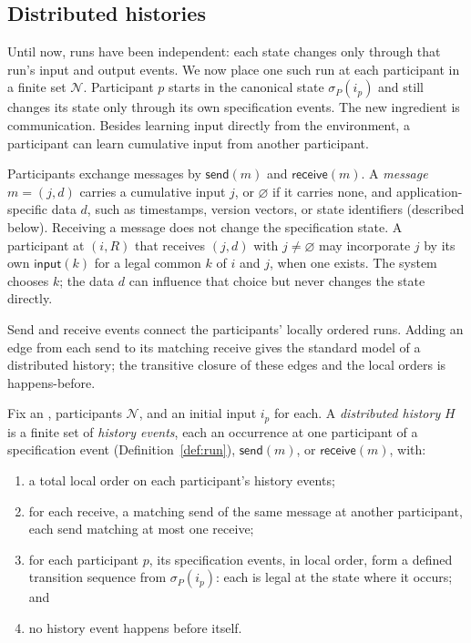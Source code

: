 
\subsection{Distributed histories}
\label{sec:histories}

Until now, runs have been independent: each state changes only through that
run's input and output events.  We now place one such run at each participant in
a finite set $\mathcal N$.  Participant $p$ starts in the canonical state
$\sigma_P(i_p)$ and still changes its state only through its own specification
events.  The new ingredient is communication.  Besides learning input directly
from the environment, a participant can learn cumulative input from another
participant.

Participants exchange messages by $\mathsf{send}(m)$ and
$\mathsf{receive}(m)$.  A \emph{message} $m=(j,d)$ carries a cumulative input $j$, or $\varnothing$ if it
carries none, and application-specific data $d$, such as timestamps, version
vectors, or state identifiers (described below).  Receiving a message does not
change the specification state.  A participant at $(i,R)$ that receives $(j,d)$ with
$j\neq\varnothing$ may incorporate $j$ by its own $\mathsf{input}(k)$ for a
legal common \indesc $k$ of $i$ and $j$, when one exists.  The system chooses $k$; the data $d$ can influence that choice but never
changes the state directly.

Send and receive events connect the participants' locally ordered runs.  Adding
an edge from each send to its matching receive gives the standard model of a
distributed history; the transitive closure of these edges and the local orders
is happens-before.

\begin{definition}
\label{def:distributed-history}
Fix an \spectype, participants $\mathcal N$, and an initial input $i_p$
for each.  A \emph{distributed history} $H$ is a finite set of
\emph{history events}, each an occurrence at one participant of a
specification event (Definition~\ref{def:run}), $\mathsf{send}(m)$, or
$\mathsf{receive}(m)$, with:
\begin{enumerate}
  \item a total local order on each participant's history events;
  \item for each receive, a matching send of the same message at another
        participant, each send matching at most one receive;
  \item for each participant $p$, its specification events, in local order,
        form a defined transition sequence from $\sigma_P(i_p)$: each
        is legal at the state where it occurs; and
    \item no history event happens before itself.
\end{enumerate}
\end{definition}

